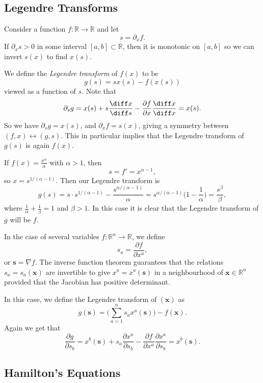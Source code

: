 \documentclass[12pt]{article}
\begin{document}
\subsection{Legendre Transforms}
\label{sub:legendre}

Consider a function $f : \mathbb{R} \to \mathbb{R}$ and let
\[
s = \partial_x f.
\]
If $\partial_x s > 0$ in some interval $[a, b] \subset \mathbb{R}$, then it is monotonic on $[a, b]$ so we can invert $s(x)$ to find $x(s)$.

We define the \emph{Legendre transform} of $f(x)$ to be
\[
g(s) = s x(s) - f(x(s))
\]
viewed as a function of $s$. Note that
\[
\partial_s g = x(s) + s\frac{\diff x}{\diff s} - \frac{\partial f}{\partial x} \frac{\diff x}{\diff x} = x(s).
\]
So we have $\partial_s g = x(s)$, and $\partial_x f = s(x)$, giving a symmetry between $(f, x) \leftrightarrow (g, s)$. This in particular implies that the Legendre transform of $g(s)$ is again $f(x)$.

\begin{exbox}
	If $f(x) = \frac{x^{\alpha}}{\alpha}$ with $\alpha > 1$, then
	\[
	s = f' = x^{\alpha-1},
	\]
	so $x = s^{1/(\alpha - 1)}$. Then our Legendre transform is
	\[
	g(s) = s \cdot s^{1/(\alpha - 1)} - \frac{s^{\alpha/(\alpha-1)}}{\alpha} = s^{\alpha/(\alpha-1)}\biggl(1 - \frac{1}{\alpha} \biggr) = \frac{s^{\beta}}{\beta},
	\]
	where $\frac{1}{\alpha} + \frac{1}{\beta} = 1$ and $\beta > 1$. In this case it is clear that the Legendre transform of $g$ will be $f$.
\end{exbox}

In the case of several variables $f : \mathbb{R}^{n} \to \mathbb{R}$, we define
\[
s_a = \frac{\partial f}{\partial x^a},
\]
or $\mathbf{s} = \nabla f$. The inverse function theorem guarantees that the relations $s_a = s_a(\mathbf{x})$ are invertible to give $x^a = x^a(\mathbf{s})$ in a neighbourhood of $\mathbf{x} \in \mathbb{R}^{n}$ provided that the Jacobian has positive determinant.

In this case, we define the Legendre transform of $(\mathbf{x})$ as
\[
g(\mathbf{s}) = \Biggl( \sum_{a = 1}^{n} s_a x^a(\mathbf{s}) \Biggr) - f(\mathbf{x}).
\]
Again we get that
\[
	\frac{\partial g}{\partial s_b} = x^b(\mathbf{s}) + s_a \frac{\partial x^a}{\partial s_b} - \frac{\partial f}{\partial x^a} \frac{\partial x^a}{\partial s_b} = x^b(\mathbf{s}).
\]

\subsection{Hamilton's Equations}
\label{sub:hams_eqns}
\end{document}
